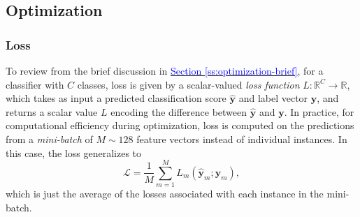 \documentclass[11pt, a4paper]{article}
\newcommand{\myhref}[2]{\hyperref[#1]{\textcolor{blue}{#2}}}
\renewcommand{\vec}[1]{\bm{#1}}
\newcommand{\y}{\vec{y}}
\begin{document}
\subsection{Optimization} \label{ss:optimization}

\subsubsection{Loss} \label{sss:loss}
To review from the brief discussion in \myhref{ss:optimization-brief}{Section \ref{ss:optimization-brief}}, for a classifier with $ C $ classes, loss is given by a scalar-valued \textit{loss function} $ L : \mathbb{R}^{C} \to \mathbb{R} $, which takes as input a predicted classification score $ \hat{\y} $ and label vector $ \y $, and returns a scalar value $ L $ encoding the difference between $ \hat{\y} $ and $ \y $. In practice, for computational efficiency during optimization, loss is computed on the predictions from a \textit{mini-batch} of $ M \sim 128 $ feature vectors instead of individual instances. In this case, the loss generalizes to 
    \begin{equation}
        \mathcal{L} = \frac{1}{M} \sum_{m = 1}^{M} L_{m} (\hat{\y}_{m}; \y_{m}), \label{eq:loss-batch}
    \end{equation}
    which is just the average of the losses associated with each instance in the mini-batch.
\end{document}
